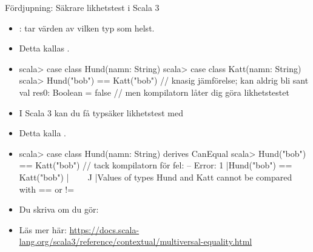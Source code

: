 \begin{Slide}{Fördjupning: Säkrare likhetstest i Scala 3}
\SlideFontSmall
\begin{itemize}
\item {}:  tar värden av vilken typ som helst.
\item Detta kallas .
\item[]
\begin{REPLsmall}
scala> case class Hund(namn: String)
scala> case class Katt(namn: String)
scala> Hund("bob") == Katt("bob") // knasig jämförelse; kan aldrig bli sant
val res0: Boolean = false         // men kompilatorn låter dig göra likhetstestet
\end{REPLsmall}  
\pause
\item I Scala 3 kan du få typsäker likhetstest med~~
\item Detta kalla .
\item[]
\begin{REPLsmall}
scala> case class Hund(namn: String) derives CanEqual
scala> Hund("bob") == Katt("bob")   // tack kompilatorn för fel:
-- Error:
1 |Hund("bob") == Katt("bob")
  |^^^^^^^^^^^^^^^^^^^^^^^^^^
  |Values of types Hund and Katt cannot be compared with == or !=
\end{REPLsmall}  
\item Du  skriva  om du gör: \\ 
\item Läs mer här: \url{https://docs.scala-lang.org/scala3/reference/contextual/multiversal-equality.html}

\end{itemize}

\end{Slide}

